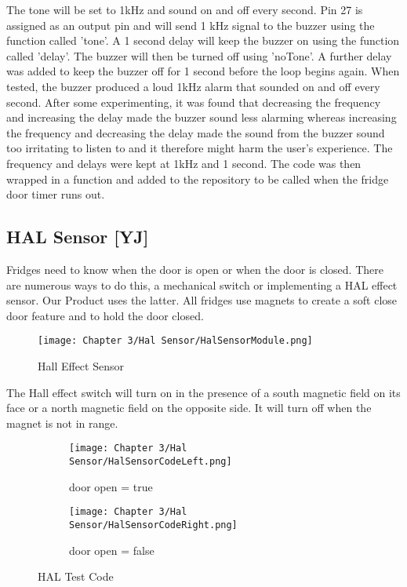 The tone will be set to 1kHz and sound on and off every second.
Pin 27 is assigned as an output pin and will send 1 kHz signal to the buzzer using the function called 'tone'.
A 1 second delay will keep the buzzer on using the function called 'delay'.
The buzzer will then be turned off using 'noTone'.
A further delay was added to keep the buzzer off for 1 second before the loop begins again.
When tested, the buzzer produced a loud 1kHz alarm that sounded on and off every second.
After some experimenting, it was found that decreasing the frequency and increasing the delay made the buzzer sound less alarming whereas increasing the frequency and decreasing the delay made the sound from the buzzer sound too irritating to listen to and it therefore might harm the user's experience.
The frequency and delays were kept at 1kHz and 1 second.
The code was then wrapped in a function and added to the repository to be called when the fridge door timer runs out.


\subsection{HAL Sensor [YJ]}

Fridges need to know when the door is open or when the door is closed.
There are numerous ways to do this, a mechanical switch or implementing a HAL effect sensor.
Our Product uses the latter.
All fridges use magnets to create a soft close door feature and to hold the door closed.

\begin{figure}[H]        
    \centering
    \texttt{[image: Chapter 3/Hal Sensor/HalSensorModule.png]}
    \caption{Hall Effect Sensor}
    \label{fig:hallsens}
\end{figure} 

The Hall effect switch will turn on in the presence of a south magnetic field on its face or a north magnetic field on the opposite side.
It will turn off when the magnet is not in range.

\begin{figure}[H]
    \begin{subfigure}{.5\textwidth}
        \centering
        \texttt{[image: Chapter 3/Hal Sensor/HalSensorCodeLeft.png]}
        \caption{door open = true}
    \end{subfigure}%
    \begin{subfigure}{.5\textwidth}
        \centering
        \texttt{[image: Chapter 3/Hal Sensor/HalSensorCodeRight.png]}
        \caption{door open = false}
    \end{subfigure}
    \caption{HAL Test Code}
    \label{fig:halcode}
\end{figure}

